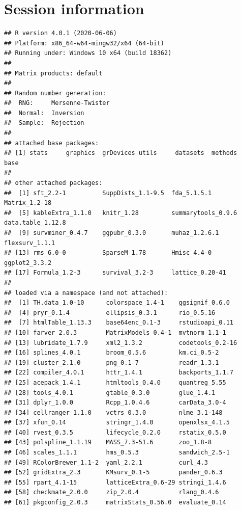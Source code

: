 \documentclass[]{article}
\begin{document}
\newpage

\section{Session information}\label{session-information}

\begin{verbatim}
## R version 4.0.1 (2020-06-06)
## Platform: x86_64-w64-mingw32/x64 (64-bit)
## Running under: Windows 10 x64 (build 18362)
## 
## Matrix products: default
## 
## Random number generation:
##  RNG:     Mersenne-Twister 
##  Normal:  Inversion 
##  Sample:  Rejection 
##  
## attached base packages:
## [1] stats     graphics  grDevices utils     datasets  methods   base     
## 
## other attached packages:
##  [1] sft_2.2-1          SuppDists_1.1-9.5  fda_5.1.5.1        Matrix_1.2-18     
##  [5] kableExtra_1.1.0   knitr_1.28         summarytools_0.9.6 data.table_1.12.8 
##  [9] survminer_0.4.7    ggpubr_0.3.0       muhaz_1.2.6.1      flexsurv_1.1.1    
## [13] rms_6.0-0          SparseM_1.78       Hmisc_4.4-0        ggplot2_3.3.2     
## [17] Formula_1.2-3      survival_3.2-3     lattice_0.20-41   
## 
## loaded via a namespace (and not attached):
##  [1] TH.data_1.0-10      colorspace_1.4-1    ggsignif_0.6.0     
##  [4] pryr_0.1.4          ellipsis_0.3.1      rio_0.5.16         
##  [7] htmlTable_1.13.3    base64enc_0.1-3     rstudioapi_0.11    
## [10] farver_2.0.3        MatrixModels_0.4-1  mvtnorm_1.1-1      
## [13] lubridate_1.7.9     xml2_1.3.2          codetools_0.2-16   
## [16] splines_4.0.1       broom_0.5.6         km.ci_0.5-2        
## [19] cluster_2.1.0       png_0.1-7           readr_1.3.1        
## [22] compiler_4.0.1      httr_1.4.1          backports_1.1.7    
## [25] acepack_1.4.1       htmltools_0.4.0     quantreg_5.55      
## [28] tools_4.0.1         gtable_0.3.0        glue_1.4.1         
## [31] dplyr_1.0.0         Rcpp_1.0.4.6        carData_3.0-4      
## [34] cellranger_1.1.0    vctrs_0.3.0         nlme_3.1-148       
## [37] xfun_0.14           stringr_1.4.0       openxlsx_4.1.5     
## [40] rvest_0.3.5         lifecycle_0.2.0     rstatix_0.5.0      
## [43] polspline_1.1.19    MASS_7.3-51.6       zoo_1.8-8          
## [46] scales_1.1.1        hms_0.5.3           sandwich_2.5-1     
## [49] RColorBrewer_1.1-2  yaml_2.2.1          curl_4.3           
## [52] gridExtra_2.3       KMsurv_0.1-5        pander_0.6.3       
## [55] rpart_4.1-15        latticeExtra_0.6-29 stringi_1.4.6      
## [58] checkmate_2.0.0     zip_2.0.4           rlang_0.4.6        
## [61] pkgconfig_2.0.3     matrixStats_0.56.0  evaluate_0.14      

\end{verbatim}
\end{document}
